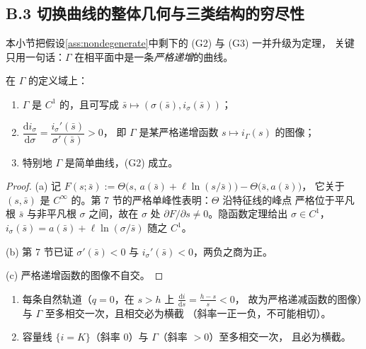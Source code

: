 \subsection*{B.3 切换曲线的整体几何与三类结构的穷尽性}

本小节把假设\ref{ass:nondegenerate}中剩下的 (G2) 与 (G3) 一并升级为定理，
关键只用一句话：$\Gamma$ 在相平面中是一条\emph{严格递增}的曲线。

\begin{theorem}
\label{thm:Gamma-increasing}
在 $\Gamma$ 的定义域上：
\begin{enumerate}
\item[(a)] $\Gamma$ 是 $C^1$ 的，且可写成 $\bar s\mapsto(\sigma(\bar s),i_\sigma(\bar s))$；
\item[(b)] $\dfrac{\mathrm{d}i_\sigma}{\mathrm{d}\sigma}
      =\dfrac{i_\sigma'(\bar s)}{\sigma'(\bar s)}>0$，
      即 $\Gamma$ 是某严格递增函数 $s\mapsto i_\Gamma(s)$ 的图像；
\item[(c)] 特别地 $\Gamma$ 是简单曲线，(G2) 成立。
\end{enumerate}
\end{theorem}

\begin{proof}
(a) 记 $F(s;\bar s):=\Theta\bigl(s,\,a(\bar s)+\ell\ln(s/\bar s)\bigr)-\Theta\bigl(\bar s,a(\bar s)\bigr)$，
它关于 $(s,\bar s)$ 是 $C^\infty$ 的。第 7 节的严格单峰性表明：$\Theta$ 沿特征线的峰点
严格位于平凡根 $\bar s$ 与非平凡根 $\sigma$ 之间，故在 $\sigma$ 处
$\partial F/\partial s\neq0$。隐函数定理给出 $\sigma\in C^1$，
$i_\sigma(\bar s)=a(\bar s)+\ell\ln(\sigma/\bar s)$ 随之 $C^1$。

(b) 第 7 节已证 $\sigma'(\bar s)<0$ 与 $i_\sigma'(\bar s)<0$，两负之商为正。

(c) 严格递增函数的图像不自交。
\end{proof}

\begin{corollary}[(G3) 全部为定理]
\label{cor:G3-theorem}
\begin{enumerate}
\item[(i)] 每条自然轨道（$q=0$，在 $s>h$ 上 $\frac{\mathrm{d}i}{\mathrm{d}s}=\frac{h-s}{s}<0$，
      故为严格递减函数的图像）与 $\Gamma$ 至多相交一次，且相交必为横截
      （斜率一正一负，不可能相切）。
\item[(ii)] 容量线 $\{i=K\}$（斜率 $0$）与 $\Gamma$（斜率 $>0$）至多相交一次，
      且必为横截。
\end{enumerate}
\end{corollary}

